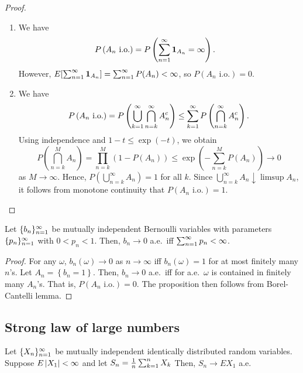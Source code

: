 \documentclass[a4paper]{article}
\begin{document}
\begin{proof}
\begin{enumerate}
  \item We have 
  \begin{align*}
    P \left( A_n \text{ i.o.} \right) 
    &= P \left( \sum_{n=1}^\infty \operatorname{\mathbf{1}}_{A_n} = \infty \right).
  \end{align*}
  However, $E [\sum_{n=1}^\infty \operatorname{\mathbf{1}}_{A_n}] = \sum_{n=1}^\infty P (A_n) < \infty$,
  so $P (A_n \text{ i.o.}) = 0$.

  \item We have 
  \begin{align*}
    P \left( A_n \text{ i.o.} \right) 
    = P \left( \bigcup_{k=1}^\infty \bigcap_{n = k}^\infty A_n^c \right)
    \leq \sum_{k=1}^\infty P \left( \bigcap_{n=k}^\infty A_n^c \right).
  \end{align*}
  Using independence and $1 - t \leq \exp (- t)$, 
  we obtain 
  \[
  P \left( \bigcap_{n=k}^M A_n \right)
  = \prod_{n=k}^M (1 - P (A_n)) 
  \leq \exp \left( - \sum_{n=k}^M P (A_n) \right) \to 0
  \]
  as $M \to \infty$. Hence, $P \left( \bigcup_{n=k}^\infty A_n \right)
  = 1$ for all $k$. Since $\bigcup_{n=k}^\infty A_n \downarrow \limsup A_n$,
  it follows from monotone continuity that $P (A_n \text{ i.o.}) = 1$.
\end{enumerate}
\end{proof}

\begin{prop}
  Let $\{ b_n \}_{n=1}^\infty$ be mutually independent Bernoulli variables 
  with parameters $\{ p_n \}_{n=1}^\infty$ with $0 < p_n < 1$. 
  Then, $b_n \to 0$ a.e.\ iff $\sum_{n=1}^\infty p_n < \infty$.
\end{prop}

\begin{proof}
  For any $\omega$, $b_n (\omega) \to 0$ as $n \to \infty$ iff 
  $b_n (\omega) = 1$ for at most finitely many $n$'s. 
  Let $A_n = \left\{ b_n = 1 \right\}$. Then, 
  $b_n \to 0$ a.e.\ iff for a.e.\ $\omega$ is contained 
  in finitely many $A_n$'s. That is, $P (A_n \text{ i.o.}) = 0$.
  The proposition then follows from Borel-Cantelli lemma.

\end{proof}

\subsection{Strong law of large numbers}

\begin{thm}
  Let $\{ X_n \}_{n=1}^\infty$ be mutually independent identically distributed
  random variables. Suppose $E \left\lvert X_1\right\rvert < \infty$
  and let $S_n = \frac{1}{n} \sum_{k=1}^n X_k$ 
  Then, $S_n \to E X_1$ a.e.\
\end{thm}
\end{document}
